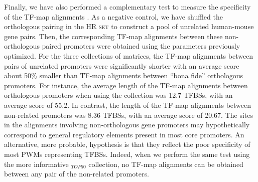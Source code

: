 Finally, we have also performed a complementary
test to measure the specificity of the TF-map alignments \citep{blanco:2006b}. 
As a negative control, we have shuffled the orthologous pairing in the
\textsc{HR set} to construct a pool of unrelated human-mouse gene pairs. 
Then, the corresponding TF-map alignments between these non-orthologous paired
promoters were obtained using the parameters previously optimized.
For the three collections of matrices, the  TF-map alignments
between pairs of unrelated promoters were significantly shorter with
an average score about 50\% smaller than TF-map alignments between
``bona fide'' orthologous promoters. For instance, the average length of 
the TF-map alignments between orthologous promoters when using the  
collection was 12.7 TFBSs, with an average score of 55.2. In contrast, 
the length of the TF-map alignments between non-related promoters was 
8.36 TFBSs, with an average score of 20.67. The sites in the
alignments involving non-orthologous gene promoters may hypothetically
correspond to general regulatory elements present in most
core promoters. An alternative, more probable, hypothesis is that they
reflect the poor specificity of most PWMs representing TFBSs.
Indeed, when we perform the same test using the more
informative $_{TOP50}$ collection, no TF-map alignments can be 
obtained between any pair of the non-related promoters.

\label{sec:testregions}


